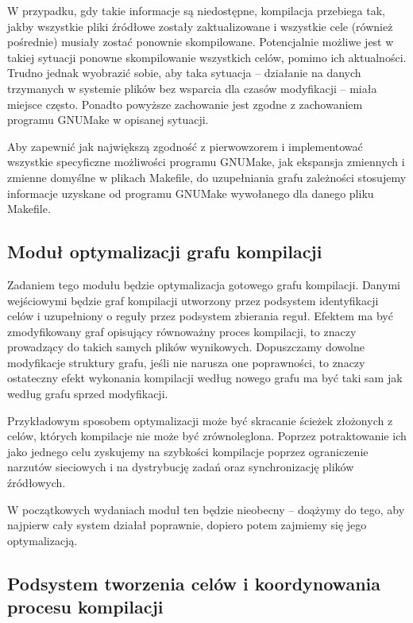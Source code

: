 \documentclass[a4paper]{article}
\begin{document}
W przypadku, gdy takie informacje są niedostępne, kompilacja przebiega tak, jakby wszystkie pliki źródłowe zostały zaktualizowane i wszystkie cele (również pośrednie) musiały zostać ponownie skompilowane.
Potencjalnie możliwe jest w takiej sytuacji ponowne skompilowanie wszystkich celów, pomimo ich aktualności.
Trudno jednak wyobrazić sobie, aby taka sytuacja -- działanie na danych trzymanych w systemie plików bez wsparcia dla czasów modyfikacji -- miała miejsce często.
Ponadto powyższe zachowanie jest zgodne z zachowaniem programu GNUMake w opisanej sytuacji.

Aby zapewnić jak największą zgodność z pierwowzorem i implementować wszystkie specyficzne możliwości programu GNUMake, jak ekspansja zmiennych i zmienne domyślne w plikach Makefile, do uzupełniania grafu zależności stosujemy informacje uzyskane od programu GNUMake wywołanego dla danego pliku Makefile.

\subsection{Moduł optymalizacji grafu kompilacji}

Zadaniem tego modułu będzie optymalizacja gotowego grafu kompilacji.
Danymi wejściowymi będzie graf kompilacji utworzony przez podsystem identyfikacji celów i uzupełniony o reguły przez podsystem zbierania reguł.
Efektem ma być zmodyfikowany graf opisujący równoważny proces kompilacji, to znaczy prowadzący do takich samych plików wynikowych.
Dopuszczamy dowolne modyfikacje struktury grafu, jeśli nie narusza one poprawności, to znaczy ostateczny efekt wykonania kompilacji według nowego grafu ma być taki sam jak według grafu sprzed modyfikacji.

Przykładowym sposobem optymalizacji może być skracanie ścieżek złożonych z celów, których kompilacje nie może być zrównoleglona.
Poprzez potraktowanie ich jako jednego celu zyskujemy na szybkości kompilacje poprzez ograniczenie narzutów sieciowych i na dystrybucję zadań oraz synchronizację plików źródłowych.

W początkowych wydaniach moduł ten będzie nieobecny -- doążymy do tego, aby najpierw cały system działał poprawnie, dopiero potem zajmiemy się jego optymalizacją.

\subsection{Podsystem tworzenia celów i koordynowania procesu kompilacji}
\end{document}
